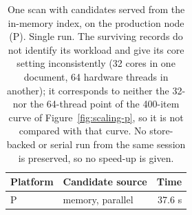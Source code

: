 \begin{table}[htbp]
\centering
\caption{One scan with candidates served from the in-memory index, on the production node (P). Single run. The surviving records do not identify its workload and give its core setting inconsistently (32 cores in one document, 64 hardware threads in another); it corresponds to neither the 32- nor the 64-thread point of the 400-item curve of Figure~\ref{fig:scaling-p}, so it is not compared with that curve. No store-backed or serial run from the same session is preserved, so no speed-up is given.}
\label{tab:index}
\footnotesize
\begin{tabular}{l l r}
\hline
Platform & Candidate source & Time \\
\hline
P & memory, parallel & 37.6 s \\
\hline
\end{tabular}
\end{table}
